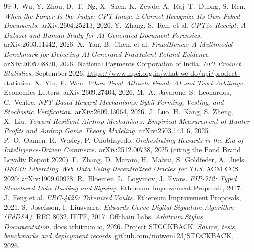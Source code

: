 \documentclass[10.5pt,letterpaper]{article}
\theoremstyle{definition}
\theoremstyle{remark}
\newcommand{\seal}[1]{%
  \tikz[baseline=-0.6ex]{\fill[shu] (0,0) circle (#1);
  \node[text=washi,font=\bfseries\fontsize{#1*1.5cm}{#1*1.5cm}\selectfont] at (0,0) {S};}}
\begin{document}
\begin{center}\seal{0.32cm}\end{center}

\small
\begin{thebibliography}{99}\setlength{\itemsep}{1pt}
 J.~Wu, Y.~Zhou, D.~T.~Ng, X.~Shen, K.~Zewde, A.~Raj, T.~Duong, S.~Ren. \emph{When the Forger Is the Judge: GPT-Image-2 Cannot Recognize Its Own Faked Documents.} arXiv:2604.25213, 2026.
 Y.~Zhang, S.~Ren, et al. \emph{GPT4o-Receipt: A Dataset and Human Study for AI-Generated Document Forensics.} arXiv:2603.11442, 2026.
 X.~Yan, B.~Chen, et al. \emph{FraudBench: A Multimodal Benchmark for Detecting AI-Generated Fraudulent Refund Evidence.} arXiv:2605.08820, 2026.
 National Payments Corporation of India. \emph{UPI Product Statistics}, September 2026. \url{https://www.npci.org.in/what-we-do/upi/product-statistics}.
 X.~Yin, F.~Wen. \emph{When Trust Attracts Fraud: AI and Trust Arbitrage.} Economics Letters; arXiv:2609.27404, 2026.
 M.~A.~Javarone, S.~Leonardos, C.~Ventre. \emph{NFT-Based Reward Mechanisms: Sybil Farming, Vesting, and Stochastic Verification.} arXiv:2609.13064, 2026.
 J.~Luo, H.~Kang, S.~Zheng, X.~Liu. \emph{Toward Resilient Airdrop Mechanisms: Empirical Measurement of Hunter Profits and Airdrop Game Theory Modeling.} arXiv:2503.14316, 2025.
 P.~O.~Oamen, R.~Wesley, P.~Onobhayedo. \emph{Orchestrating Rewards in the Era of Intelligence-Driven Commerce.} arXiv:2512.00738, 2025 (citing the Bond Brand Loyalty Report 2020).
 F.~Zhang, D.~Maram, H.~Malvai, S.~Goldfeder, A.~Juels. \emph{DECO: Liberating Web Data Using Decentralized Oracles for TLS.} ACM CCS 2020; arXiv:1909.00938.
 R.~Bloemen, L.~Logvinov, J.~Evans. \emph{EIP-712: Typed Structured Data Hashing and Signing.} Ethereum Improvement Proposals, 2017.
 J.~Feng et al. \emph{ERC-4626: Tokenized Vaults.} Ethereum Improvement Proposals, 2021.
 S.~Josefsson, I.~Liusvaara. \emph{Edwards-Curve Digital Signature Algorithm (EdDSA).} RFC 8032, IETF, 2017.
 Offchain Labs. \emph{Arbitrum Stylus Documentation.} docs.arbitrum.io, 2026.
 Project STOCKBACK. \emph{Source, tests, benchmarks and deployment records.} github.com/notwen123/STOCKBACK, 2026.
\end{thebibliography}
\end{document}
